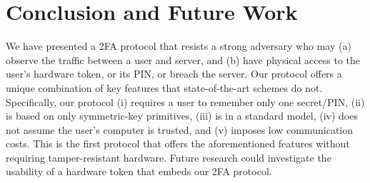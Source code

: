 

\section{Conclusion and Future Work}

We have presented a 2FA protocol that resists a strong adversary who may (a) observe the traffic between a user and server, and (b) have physical access to the user’s hardware token, or its PIN, or breach the server. Our protocol offers a unique combination of key features that state-of-the-art schemes do not. Specifically,  our protocol (i) requires a user to remember only one secret/PIN, (ii) is based on only symmetric-key primitives, (iii) is in a standard model, (iv) does not assume the user's computer is trusted, and (v) imposes low communication costs. This is the first protocol that offers the aforementioned features without requiring tamper-resistant hardware. Future research could investigate the usability of a hardware token that embeds our 2FA protocol. 

